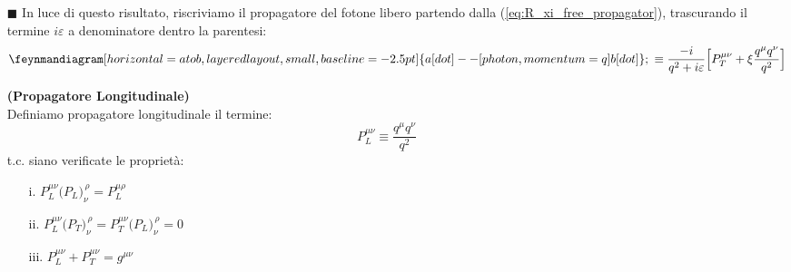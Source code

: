 \documentclass[../main.tex]{subfiles}
\begin{document}
\begin{nota}
\begin{itemize}
        \item[$\blacksquare$] In luce di questo risultato, riscriviamo il propagatore del fotone libero partendo dalla (\ref{eq:R_xi_free_propagator}), trascurando il termine $i\varepsilon$ a denominatore dentro la parentesi:
        \begin{equation}
            \feynmandiagram[horizontal=a to b, layered layout, small, baseline=\plusheight] {
                                                a[dot]  -- [photon, momentum={q}] b[dot]
                                                };
            ~ \equiv \frac{-i}{q^2 +i\varepsilon}\Bigl[P_T^{\mu\nu} + \xi\frac{q^\mu q^\nu}{q^2}\Bigr]
            \label{eq:R_xi_free_propagator_transverseprojector}
        \end{equation}
        \begin{definition} 
            \textbf{(Propagatore Longitudinale)}\\
            Definiamo propagatore longitudinale il termine:
            \[P_L^{\mu\nu} \equiv \frac{q^\mu q^\nu}{q^2}\]
            t.c. siano verificate le proprietà:
            \begin{enumerate}
                \item[i.] \( P_L^{\mu\nu}\bigl(P_L\bigr)_{\nu}^{\,\rho} =  P_L^{\mu\rho} \)
                \item[ii.] \( P_L^{\mu\nu}\bigl(P_T\bigr)_{\nu}^{\,\rho} = P_T^{\mu\nu}\bigl(P_L\bigr)_{\nu}^{\,\rho} = 0\)
                \item[iii.] \( P_L^{\mu\nu} + P_T^{\mu\nu} = g^{\mu\nu}\)
            \end{enumerate}
        \end{definition}
    \end{itemize}
\end{nota}
\end{document}
